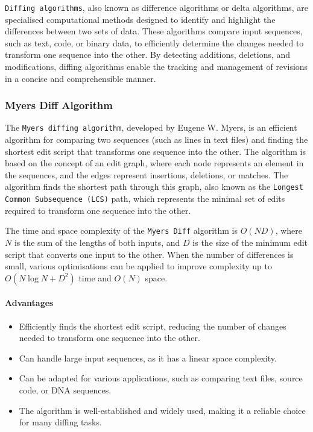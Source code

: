 \lstinline{Diffing algorithms}, also known as difference algorithms or delta algorithms, are specialised computational methods designed to identify and highlight the differences between two sets of data. These algorithms compare input sequences, such as text, code, or binary data, to efficiently determine the changes needed to transform one sequence into the other. By detecting additions, deletions, and modifications, diffing algorithms enable the tracking and management of revisions in a concise and comprehensible manner.

\subsubsection{Myers Diff Algorithm}
The \lstinline{Myers diffing algorithm}, developed by Eugene W. Myers, is an efficient algorithm for comparing two sequences (such as lines in text files) and finding the shortest edit script that transforms one sequence into the other. The algorithm is based on the concept of an edit graph, where each node represents an element in the sequences, and the edges represent insertions, deletions, or matches. The algorithm finds the shortest path through this graph, also known as the \lstinline{Longest Common Subsequence (LCS)} path, which represents the minimal set of edits required to transform one sequence into the other\cite{coglan_myers_2017}.
\smallskip

The time and space complexity of the \lstinline{Myers Diff} algorithm is $O(ND)$, where $N$ is the sum of the lengths of both inputs, and $D$ is the size of the minimum edit script that converts one input to the other. When the number of differences is small, various optimisations can be applied to improve complexity up to $O(N\log N + D^2)$ time and $O(N)$ space.


\paragraph{Advantages}
\begin{itemize}
    \item Efficiently finds the shortest edit script, reducing the number of changes needed to transform one sequence into the other.
    \item Can handle large input sequences, as it has a linear space complexity.
    \item Can be adapted for various applications, such as comparing text files, source code, or DNA sequences\cite{coglan_myers_2017}.
    \item The algorithm is well-established and widely used, making it a reliable choice for many diffing tasks.
\end{itemize}
